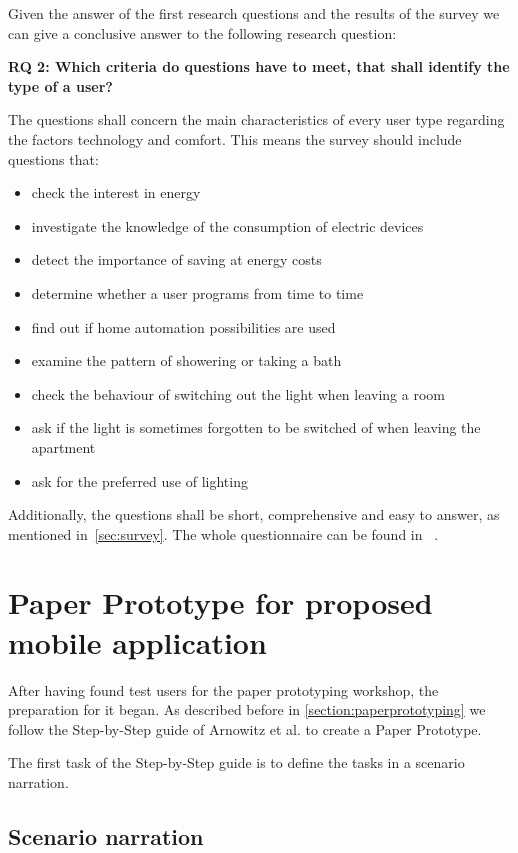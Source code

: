 Given the answer of the first research questions and the results of the survey we can give a conclusive answer to the following research question:

\textbf{RQ 2: Which criteria do questions have to meet, that shall identify the type of a user?}

The questions shall concern the main characteristics of every user type regarding the factors technology and comfort. This means the survey should include questions that:

\begin{itemize}
	\item check the interest in energy
	\item investigate the knowledge of the consumption of electric devices
	\item detect the importance of saving at energy costs
	\item determine whether a user programs from time to time
	\item find out if home automation possibilities are used
	\item examine the pattern of showering or taking a bath
	\item check the behaviour of switching out the light when leaving a room
	\item ask if the light is sometimes forgotten to be switched of when leaving the apartment
	\item ask for the preferred use of lighting 	
\end{itemize}

Additionally, the questions shall be short, comprehensive and easy to answer, as mentioned in~\ref{sec:survey}. The whole questionnaire can be found in ~.


\section{Paper Prototype for proposed mobile application}

After having found test users for the paper prototyping workshop, the preparation for it began. As described before in \ref{section:paperprototyping} we follow the Step-by-Step guide of Arnowitz et al. \cite{arnowitz2010effective} to create a Paper Prototype.

The first task of the Step-by-Step guide is to define the tasks in a scenario narration.

	\subsection{Scenario narration}
	
